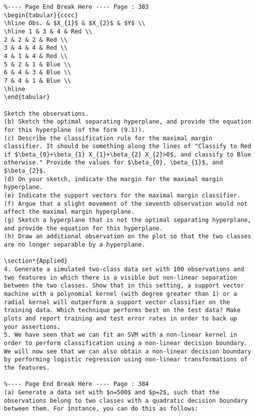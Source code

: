 \documentclass[10pt]{article}
\begin{document}
\begin{verbatim}
%---- Page End Break Here ---- Page : 383
\begin{tabular}{cccc}
\hline Obs. & $X_{1}$ & $X_{2}$ & $Y$ \\
\hline 1 & 3 & 4 & Red \\
2 & 2 & 2 & Red \\
3 & 4 & 4 & Red \\
4 & 1 & 4 & Red \\
5 & 2 & 1 & Blue \\
6 & 4 & 3 & Blue \\
7 & 4 & 1 & Blue \\
\hline
\end{tabular}

Sketch the observations.
(b) Sketch the optimal separating hyperplane, and provide the equation for this hyperplane (of the form (9.1)).
(c) Describe the classification rule for the maximal margin classifier. It should be something along the lines of "Classify to Red if $\beta_{0}+\beta_{1} X_{1}+\beta_{2} X_{2}>0$, and classify to Blue otherwise." Provide the values for $\beta_{0}, \beta_{1}$, and $\beta_{2}$.
(d) On your sketch, indicate the margin for the maximal margin hyperplane.
(e) Indicate the support vectors for the maximal margin classifier.
(f) Argue that a slight movement of the seventh observation would not affect the maximal margin hyperplane.
(g) Sketch a hyperplane that is not the optimal separating hyperplane, and provide the equation for this hyperplane.
(h) Draw an additional observation on the plot so that the two classes are no longer separable by a hyperplane.

\section*{Applied}
4. Generate a simulated two-class data set with 100 observations and two features in which there is a visible but non-linear separation between the two classes. Show that in this setting, a support vector machine with a polynomial kernel (with degree greater than 1) or a radial kernel will outperform a support vector classifier on the training data. Which technique performs best on the test data? Make plots and report training and test error rates in order to back up your assertions.
5. We have seen that we can fit an SVM with a non-linear kernel in order to perform classification using a non-linear decision boundary. We will now see that we can also obtain a non-linear decision boundary by performing logistic regression using non-linear transformations of the features.

%---- Page End Break Here ---- Page : 384
(a) Generate a data set with $n=500$ and $p=2$, such that the observations belong to two classes with a quadratic decision boundary between them. For instance, you can do this as follows:
\end{verbatim}
\end{document}
